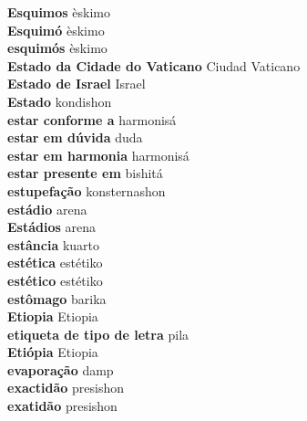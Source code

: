 \textbf{ Esquimos  } èskimo \\
\textbf{ Esquimó  } èskimo \\
\textbf{ esquimós  } èskimo \\
\textbf{ Estado da Cidade do Vaticano  } Ciudad Vaticano \\
\textbf{ Estado de Israel  } Israel \\
\textbf{ Estado  } kondishon \\
\textbf{ estar conforme a  } harmonisá \\
\textbf{ estar em dúvida  } duda \\
\textbf{ estar em harmonia  } harmonisá \\
\textbf{ estar presente em  } bishitá \\
\textbf{ estupefação  } konsternashon \\
\textbf{ estádio  } arena \\
\textbf{ Estádios  } arena \\
\textbf{ estância  } kuarto \\
\textbf{ estética  } estétiko \\
\textbf{ estético  } estétiko \\
\textbf{ estômago  } barika \\
\textbf{ Etiopia  } Etiopia \\
\textbf{ etiqueta de tipo de letra  } pila \\
\textbf{ Etiópia  } Etiopia \\
\textbf{ evaporação  } damp \\
\textbf{ exactidão  } presishon \\
\textbf{ exatidão  } presishon \\
